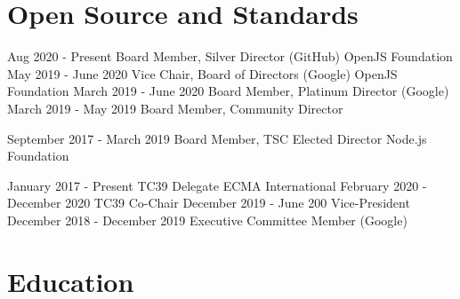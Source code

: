 \documentclass[10pt,a4paper,sans]{moderncv}   %
\begin{document}

\section{Open Source and Standards}

\cventry
  {Aug 2020 - Present}
  {Board Member, Silver Director (GitHub)}
  {OpenJS Foundation}
  {}{}{}
\cventry
  {May 2019 - June 2020}
  {Vice Chair, Board of Directors (Google)}
  {OpenJS Foundation}
  {}{}{}
\cventry
  {March 2019 - June 2020}
  {Board Member, Platinum Director (Google)}
  {}
  {}{}{}
\cventry
  {March 2019 - May 2019}
  {Board Member, Community Director}
  {}
  {}{}{}

  \cventry
  {September 2017 - March 2019}
  {Board Member, TSC Elected Director}
  {Node.js Foundation}
  {}{}{}

\cventry
  {January 2017 - Present}
  {TC39 Delegate}
  {ECMA International}
  {}{}{}
\cventry
  {February 2020 - December 2020}
  {TC39 Co-Chair}
  {}
  {}{}{}
\cventry
  {December 2019 - June 200}
  {Vice-President}
  {}
  {}{}{}
\cventry
  {December 2018 - December 2019}
  {Executive Committee Member (Google)}
  {}
  {}{}{}


\section{Education}
\end{document}
